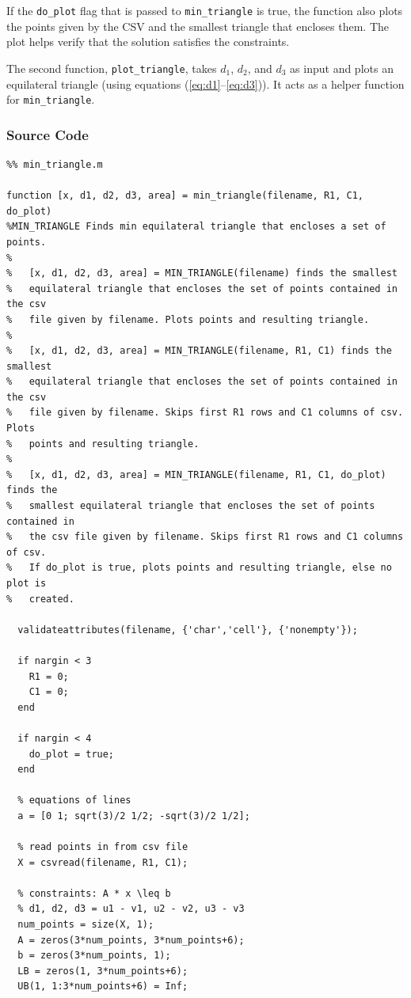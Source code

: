 \documentclass{article}
\begin{document}
\noindent If the \texttt{do\_plot} flag that is passed to \texttt{min\_triangle} is true, the function also plots the points given by the CSV and the smallest triangle that encloses them.
The plot helps verify that the solution satisfies the constraints.

The second function, \texttt{plot\_triangle}, takes $d_1$, $d_2$, and $d_3$ as input and plots an equilateral triangle (using equations (\ref{eq:d1}--\ref{eq:d3})).
It acts as a helper function for \texttt{min\_triangle}.

\subsubsection{Source Code}

\begin{lstlisting}
%% min_triangle.m

function [x, d1, d2, d3, area] = min_triangle(filename, R1, C1, do_plot)
%MIN_TRIANGLE Finds min equilateral triangle that encloses a set of points.
%
%   [x, d1, d2, d3, area] = MIN_TRIANGLE(filename) finds the smallest
%   equilateral triangle that encloses the set of points contained in the csv
%   file given by filename. Plots points and resulting triangle.
%
%   [x, d1, d2, d3, area] = MIN_TRIANGLE(filename, R1, C1) finds the smallest
%   equilateral triangle that encloses the set of points contained in the csv
%   file given by filename. Skips first R1 rows and C1 columns of csv. Plots
%   points and resulting triangle.
%
%   [x, d1, d2, d3, area] = MIN_TRIANGLE(filename, R1, C1, do_plot) finds the 
%   smallest equilateral triangle that encloses the set of points contained in 
%   the csv file given by filename. Skips first R1 rows and C1 columns of csv.
%   If do_plot is true, plots points and resulting triangle, else no plot is
%   created.

  validateattributes(filename, {'char','cell'}, {'nonempty'});
  
  if nargin < 3
    R1 = 0;
    C1 = 0;
  end
  
  if nargin < 4
    do_plot = true;
  end
  
  % equations of lines
  a = [0 1; sqrt(3)/2 1/2; -sqrt(3)/2 1/2];
  
  % read points in from csv file
  X = csvread(filename, R1, C1);
  
  % constraints: A * x \leq b
  % d1, d2, d3 = u1 - v1, u2 - v2, u3 - v3
  num_points = size(X, 1);
  A = zeros(3*num_points, 3*num_points+6);
  b = zeros(3*num_points, 1);
  LB = zeros(1, 3*num_points+6);
  UB(1, 1:3*num_points+6) = Inf;
  

\end{lstlisting}
\end{document}
